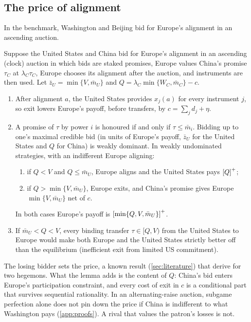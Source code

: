 

\subsection{The price of alignment}\label{sec:bidding}

In the benchmark, Washington and Beijing bid for Europe's alignment in an ascending auction.

\begin{lemma}\label{lem:bidding}
Suppose the United States and China bid for Europe's alignment in an ascending (clock) auction in which bids are staked promises, Europe values China's promise $\tau_C$ at $\lambda_C\tau_C$, Europe chooses its alignment after the auction, and instruments are then used. Let $\bar z_U=\min\{V,\bar m_U\}$ and $Q=\lambda_C\min\{W_C,\bar m_C\}-c$.
\begin{enumerate}[label=(\roman*)]
\item After alignment $a$, the United States provides $x_j(a)$ for every instrument $j$, so exit lowers Europe's payoff, before transfers, by $c=\sum_j d_j+\eta$.
\item A promise of $\tau$ by power $i$ is honoured if and only if $\tau\le\bar m_i$. Bidding up to one's maximal credible bid (in units of Europe's payoff, $\bar z_U$ for the United States and $Q$ for China) is weakly dominant. In weakly undominated strategies, with an indifferent Europe aligning:
 \begin{enumerate}[label=(\alph*)]
 \item if $Q<V$ and $Q\le\bar m_U$, Europe aligns and the United States pays $\left[Q\right]^{+}$;
 \item if $Q>\min\{V,\bar m_U\}$, Europe exits, and China's promise gives Europe $\min\{V,\bar m_U\}$ net of $c$.
 \end{enumerate}
 In both cases Europe's payoff is $\left[\min\{Q,V,\bar m_U\}\right]^{+}$.
\item If $\bar m_U<Q<V$, every binding transfer $\tau\in[Q,V)$ from the United States to Europe would make both Europe and the United States strictly better off than the equilibrium (inefficient exit from limited US commitment).
\end{enumerate}
\end{lemma}

The losing bidder sets the price, a known result (\cref{sec:literature}) that \citet[Supplement B.2]{clayton2026framework} derive for two hegemons. What the lemma adds is the content of $Q$: China's bid enters Europe's participation constraint, and every cost of exit in $c$ is a conditional part that survives sequential rationality. In an alternating-raise auction, subgame perfection alone does not pin down the price if China is indifferent to what Washington pays (\cref{app:proofs}). A rival that values the patron's losses is not.

